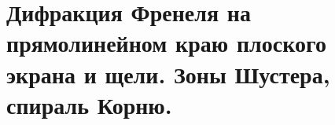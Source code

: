 \section{Дифракция Френеля на прямолинейном краю плоского экрана и щели. Зоны Шустера, спираль Корню.}